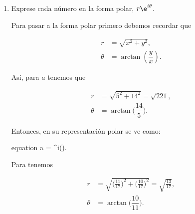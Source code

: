 \documentclass[./../main.tex]{subfiles}
\begin{document}
\begin{problema}
\begin{enumerate}
		      De los resultados del inciso anterior, tenemos que el complejo conjugado de  es

		      \begin{empheq}[box=\resultbox]{equation*}
			      a^{*} = 5 - 14i.
		      \end{empheq}

		      y de 

		      \begin{empheq}[box=\resultbox]{equation*}
			      b^{*} =  - i.
		      \end{empheq}

		\item Exprese cada número en la forma polar, \(r\e^{i\theta}\).

		      \startsolution

		      Para pasar a la forma polar primero debemos recordar que

		      \begin{align*}
			      r      & = \sqrt{x^{2} + y^{2}},             \\
			      \theta & = \arctan\left(\dfrac{y}{x}\right).
		      \end{align*}

		      Así, para \(a\) tenemos que

		      \begin{align*}
			      r      & = \sqrt{5^{2} + 14^{2}} = \sqrt{221}, \\
			      \theta & = \arctan\biggl(\dfrac{14}{5}\biggr).
		      \end{align*}

		      Entonces,  en su representación polar se ve como:

		      \begin{empheq}[box=\resultbox]{equation}
			      a = \e^{i\arctan\bigl(\bigr)}.
			      \label{eq:a-complex-polar}
		      \end{empheq}

		      Para  tenemos

		      \begin{align*}
			      r      & = \sqrt{\biggl(\tfrac{11}{17}\biggr)^{2} + \biggl(\tfrac{10}{17}\biggr)^{2}} = \sqrt{\tfrac{13}{17}}, \\
			      \theta & = \arctan\biggl(\dfrac{10}{11}\biggr).
		      \end{align*}


\end{enumerate}
\end{problema}
\end{document}
